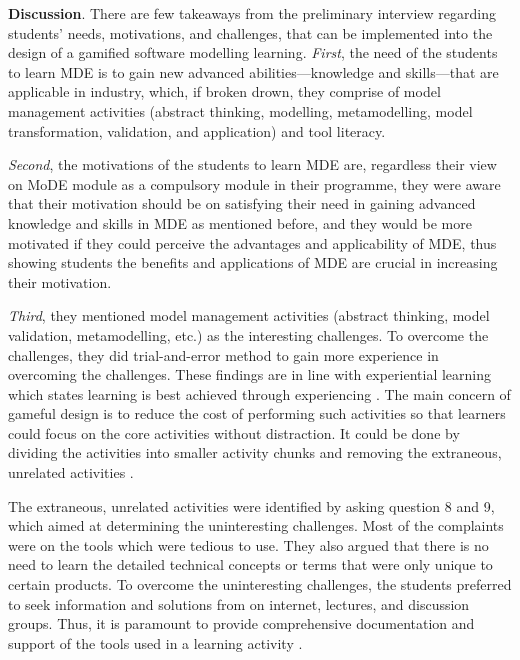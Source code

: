 \documentclass[12pt, a4paper]{report}
\begin{document}
\textbf{Discussion}. There are few takeaways from the preliminary interview regarding students' needs, motivations, and challenges, that can be implemented into the design of a gamified software modelling learning. \textit{First}, the need of the students to learn MDE is to gain new advanced abilities---knowledge and skills---that are applicable in industry, which, if broken drown, they comprise of model management activities (abstract thinking, modelling, metamodelling, model transformation, validation, and application) and tool literacy. 

\textit{Second}, the motivations of the students to learn MDE are, regardless their view on MoDE module as a compulsory module in their programme, they were aware that their motivation should be on satisfying their need in gaining advanced knowledge and skills in MDE as mentioned before, and they would be more motivated if they could perceive the advantages and applicability of MDE, thus showing students the benefits and applications of MDE are crucial in increasing their motivation.

\textit{Third}, they mentioned model management activities (abstract thinking, model validation, metamodelling, etc.) as the interesting challenges. To overcome the challenges, they did trial-and-error method to gain more experience in overcoming the challenges. These findings are in line with experiential learning which states learning is best achieved through experiencing \cite{kolb2014experiential}. The main concern of gameful design is to reduce the cost of performing such activities so that learners could focus on the core activities without distraction. It could be done by dividing the activities into smaller activity chunks and removing the extraneous, unrelated activities \cite{deterding2015lens}. 

The extraneous, unrelated activities were identified by asking question 8 and 9, which aimed at determining the uninteresting challenges. Most of the complaints were on the tools which were tedious to use. They also argued that there is no need to learn the detailed technical concepts or terms that were only unique to certain products. To overcome the uninteresting challenges, the students preferred to seek information and solutions from on internet, lectures, and discussion groups. Thus, it is paramount to provide comprehensive documentation and support of the tools used in a learning activity \cite{liebel2015ready}. 
\end{document}
